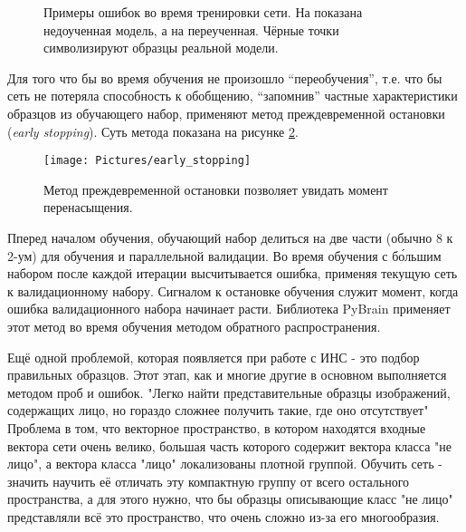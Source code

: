 \documentclass[12pt]{report}
\begin{document}
\begin{figure}[h]
	\centering
	\caption{Примеры ошибок во время тренировки сети. На  показана недоученная модель, а на 
 переученная. Чёрные точки символизируют образцы реальной модели. \citep{bradski2008learning}}
	\label{fig:under_over_fit}
\end{figure}

Для того что бы во время обучения не произошло ``переобучения'', т.е. что бы сеть не потеряла способность к 
обобщению, ``запомнив'' частные характеристики образцов из обучающего набор, применяют метод преждевременной 
остановки (\textit{early stopping}). Суть метода показана на рисунке \ref{fig:early_stop}.

\begin{figure}[h]
	\centering
	\texttt{[image: Pictures/early\_stopping]}
	\caption{Метод преждевременной остановки позволяет увидать момент перенасыщения.}
	\label{fig:early_stop}
\end{figure}

Пперед началом обучения, обучающий набор делиться на две части (обычно 8 к 2-ум) для обучения 
и 
параллельной валидации. Во время обучения с б\'{о}льшим набором после каждой итерации высчитывается ошибка, 
применяя 
текущую сеть к валидационному набору. Сигналом к остановке обучения служит момент, когда ошибка валидационного 
набора 
начинает расти. Библиотека PyBrain применяет этот метод во время обучения методом обратного распространения.

Ещё одной проблемой, которая появляется при работе с ИНС - это подбор правильных образцов. Этот этап, как и многие 
другие в основном выполняется методом проб и ошибок. "Легко найти представительные образцы изображений, содержащих 
лицо, но гораздо сложнее получить такие, где оно отсутствует" \citep{rowley1998neural} Проблема в том, что 
векторное 
пространство, в котором находятся входные вектора сети очень велико, большая часть которого содержит вектора класса 
"не лицо", а вектора класса "лицо" локализованы плотной группой. Обучить сеть - значить научить её отличать эту 
компактную группу от всего остального пространства, а для этого нужно, что бы образцы описывающие класс "не лицо" 
представляли всё это пространство, что очень сложно из-за его многообразия. %
\end{document}
